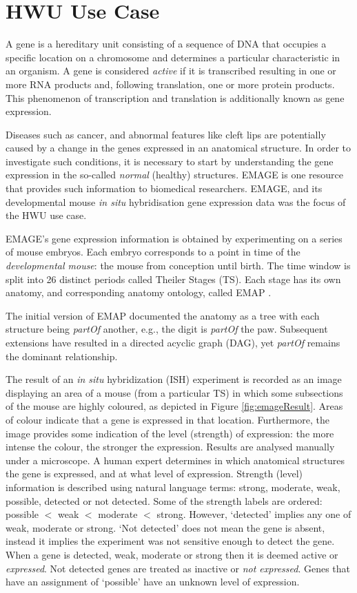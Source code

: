 \section{HWU Use Case}
A gene is a hereditary unit consisting of a sequence of DNA that occupies a specific location on a chromosome and determines a particular characteristic in an organism. A gene is considered \emph{active} if it is transcribed resulting in one or more RNA products and, following translation, one or more protein products. This phenomenon of transcription and translation is additionally known as gene expression.

Diseases such as cancer, and abnormal features like cleft lips are potentially caused by a change in the genes expressed in an anatomical structure.  In order to investigate such conditions, it is necessary to start by understanding the gene expression in the so-called \emph{normal} (healthy) structures.   EMAGE \cite{emage} is one resource that provides such information to biomedical researchers.  EMAGE, and its developmental mouse \emph{in situ} hybridisation gene expression data was the focus of the HWU use case.

EMAGE's gene expression information is obtained by experimenting on a series of mouse embryos.  Each embryo corresponds to a point in time of the \emph{developmental mouse}: the mouse from conception until birth.  The time window is split into 26 distinct periods called Theiler Stages (TS).  Each stage has its own anatomy, and corresponding anatomy ontology, called EMAP \cite{ema}. 

The initial version of EMAP documented the anatomy as a tree with each structure being \emph{partOf} another, e.g., the digit is \emph{partOf} the paw. Subsequent extensions have resulted in a directed acyclic graph (DAG), yet \emph{partOf} remains the dominant relationship.  %

The result of an \emph{in situ} hybridization (ISH) experiment is recorded as an image displaying an area of a mouse (from a particular TS) in which some subsections of the mouse are highly coloured, as depicted in Figure \ref{fig:emageResult}. Areas of colour indicate that a gene is expressed in that location. Furthermore, the image provides some indication of the level (strength) of expression: the more intense the colour, the stronger the expression. Results are analysed manually under a microscope. A human expert determines in which anatomical structures the gene is expressed, and at what level of expression. Strength (level) information is described using natural language terms: strong, moderate, weak, possible, detected or not detected. Some of the strength labels are ordered: possible $<$ weak $<$ moderate $<$ strong.  However, `detected' implies any one of weak, moderate or strong.  `Not detected' does not mean the gene is absent, instead it implies the experiment was not sensitive enough to detect the gene.  When a gene is detected, weak, moderate or strong then it is deemed active or \emph{expressed}.  Not detected genes are treated as inactive or \emph{not expressed}.  Genes that have an assignment of `possible' have an unknown level of expression.

